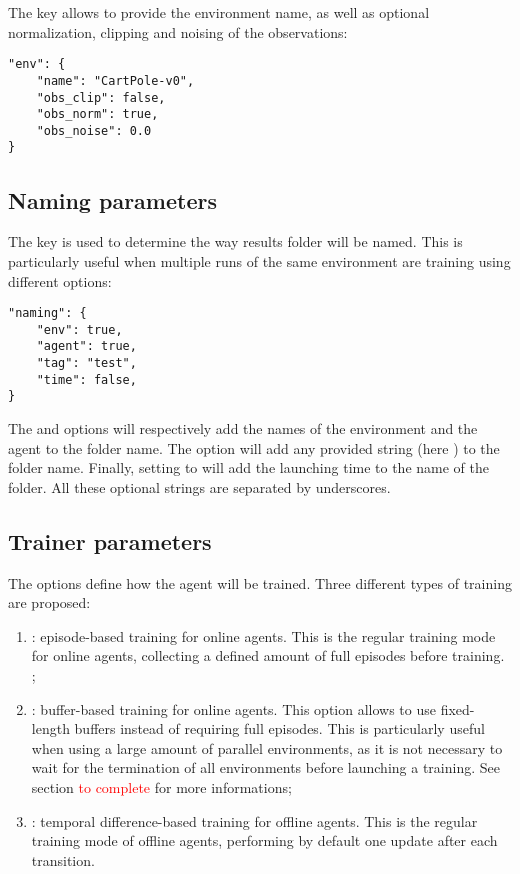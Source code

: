The  key allows to provide the environment name, as well as optional normalization, clipping and noising of the observations:

\begin{verbatim}
"env": {
	"name": "CartPole-v0",
	"obs_clip": false,
	"obs_norm": true,
	"obs_noise": 0.0
}
\end{verbatim}

\subsection{Naming parameters}
\label{section:naming_parameters}

The  key is used to determine the way results folder will be named. This is particularly useful when multiple runs of the same environment are training using different options:

\begin{verbatim}
"naming": {
	"env": true,
	"agent": true,
	"tag": "test",
	"time": false,
}
\end{verbatim}

The  and  options will respectively add the names of the environment and the agent to the folder name. The  option will add any provided string (here ) to the folder name. Finally, setting  to  will add the launching time to the name of the folder. All these optional strings are separated by underscores.

\subsection{Trainer parameters}
\label{section:trainer_parameters}

The  options define how the agent will be trained. Three different types of training are proposed:

\begin{enumerate}
	\item {}: episode-based training for online agents. This is the regular training mode for online agents, collecting a defined amount of full episodes before training. ;
	\item {}: buffer-based training for online agents. This option allows to use fixed-length buffers instead of requiring full episodes. This is particularly useful when using a large amount of parallel environments, as it is not necessary to wait for the termination of all environments before launching a training. See section \textcolor{red}{to complete} for more informations;
	\item {}: temporal difference-based training for offline agents. This is the regular training mode of offline agents, performing by default one update after each transition.
\end{enumerate}


